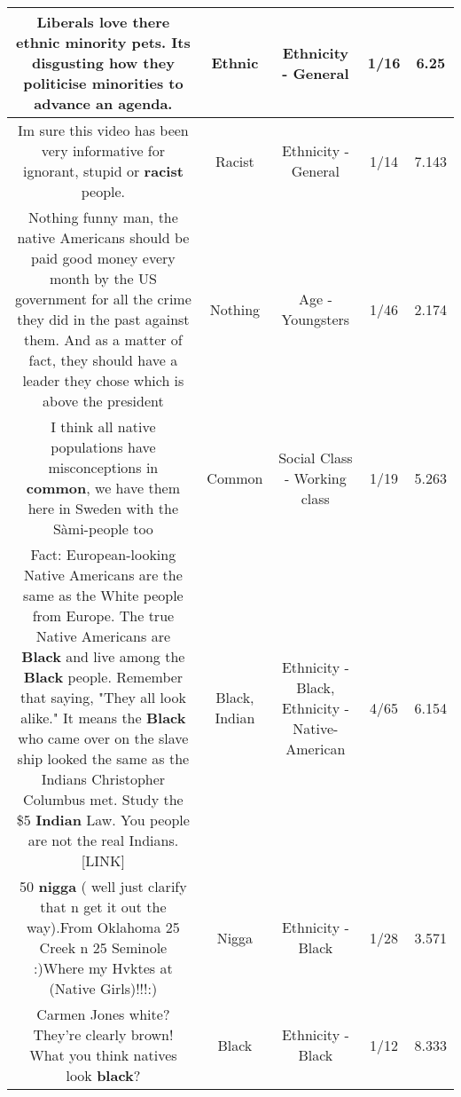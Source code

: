 \documentclass[11pt]{article}
\newlength\mylength
\begin{document}
\begin{center}
\begin{longtable}{|C{.65\mylength}|C{.30\mylength}|C{.12\mylength}|C{.12\mylength}|C{.12\mylength}|}
  \small Liberals love there \textbf{ethnic} minority pets. Its disgusting how they politicise minorities to advance an agenda.\normalsize   & Ethnic & Ethnicity - General & 1/16 & 6.25 \\  \hline
  \small Im sure this video has been very informative for ignorant, stupid or \textbf{racist} people.\normalsize   & Racist & Ethnicity - General & 1/14 & 7.143 \\  \hline
  \small Nothing funny man, the native Americans should be paid good money every month by the US government for all the crime they did in the past against them. And as a matter of fact, they should have a leader they chose which is above the president\normalsize   & Nothing & Age - Youngsters & 1/46 & 2.174 \\  \hline
  \small I think all native populations have misconceptions in \textbf{common}, we have them here in Sweden with the Sàmi-people too\normalsize   & Common & Social Class - Working class & 1/19 & 5.263 \\  \hline
  \small Fact: European-looking Native Americans are the same as the White people from Europe. The true Native Americans are \textbf{Black} and live among the \textbf{Black} people. Remember that saying, "They all look alike." It means the \textbf{Black} who came over on the slave ship looked the same as the Indians Christopher Columbus met. Study the \$5 \textbf{Indian} Law. You people are not the real Indians. [LINK] \normalsize   & Black, Indian & Ethnicity - Black, Ethnicity - Native-American & 4/65 & 6.154 \\  \hline
  \small 50 \textbf{nigga} ( well just clarify that n get it out the way).From Oklahoma 25 Creek n 25 Seminole  :)Where my Hvktes at (Native Girls)!!!:)\normalsize   & Nigga & Ethnicity - Black & 1/28 & 3.571 \\  \hline
  \small Carmen Jones white? They're clearly brown! What you think natives look \textbf{black}?\normalsize   & Black & Ethnicity - Black & 1/12 & 8.333 \\  \hline

\end{longtable}
\end{center}
\end{document}
